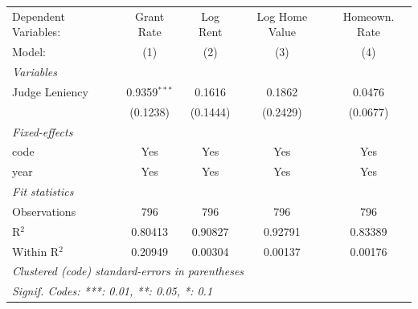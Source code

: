 
\begingroup
\centering
\begin{tabular}{lcccc}
   \tabularnewline \midrule \midrule
   Dependent Variables: & Grant Rate     & Log Rent & Log Home Value & Homeown. Rate\\  
   Model:               & (1)            & (2)      & (3)            & (4)\\  
   \midrule
   \emph{Variables}\\
   Judge Leniency       & 0.9359$^{***}$ & 0.1616   & 0.1862         & 0.0476\\   
                        & (0.1238)       & (0.1444) & (0.2429)       & (0.0677)\\   
   \midrule
   \emph{Fixed-effects}\\
   code                 & Yes            & Yes      & Yes            & Yes\\  
   year                 & Yes            & Yes      & Yes            & Yes\\  
   \midrule
   \emph{Fit statistics}\\
   Observations         & 796            & 796      & 796            & 796\\  
   R$^2$                & 0.80413        & 0.90827  & 0.92791        & 0.83389\\  
   Within R$^2$         & 0.20949        & 0.00304  & 0.00137        & 0.00176\\  
   \midrule \midrule
   \multicolumn{5}{l}{\emph{Clustered (code) standard-errors in parentheses}}\\
   \multicolumn{5}{l}{\emph{Signif. Codes: ***: 0.01, **: 0.05, *: 0.1}}\\
\end{tabular}
\par\endgroup


